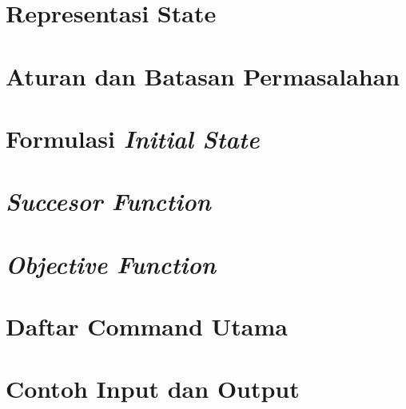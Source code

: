 \section{Representasi State}

\section{Aturan dan Batasan Permasalahan}

\section{Formulasi \textit{Initial State}}

\section{\textit{Succesor Function}}

\section{\textit{Objective Function}}

\section{Daftar Command Utama}

\section{Contoh Input dan Output}

